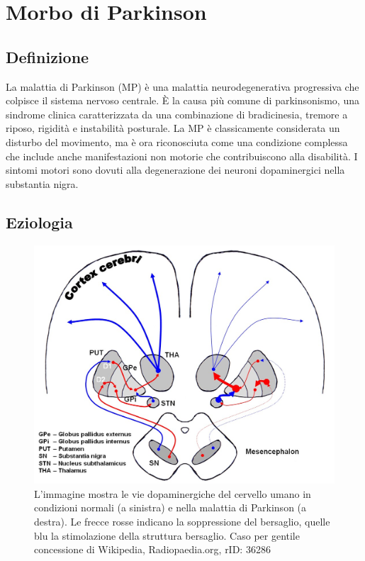 \section{Morbo di Parkinson}

\subsection{Definizione}

La malattia di Parkinson (MP) è una malattia neurodegenerativa progressiva che colpisce il sistema nervoso centrale. È la causa più comune di parkinsonismo, una sindrome clinica caratterizzata da una combinazione di bradicinesia, tremore a riposo, rigidità e instabilità posturale.
La MP è classicamente considerata un disturbo del movimento, ma è ora riconosciuta come una condizione complessa che include anche manifestazioni non motorie che contribuiscono alla disabilità. I sintomi motori sono dovuti alla degenerazione dei neuroni dopaminergici nella substantia nigra.

\subsection{Eziologia}



\begin{figure}[h]
	\centering
	\includegraphics[width=0.5\linewidth]{FileAusiliari/Immagini/degenerative/dopamine-in-parkinsons-disease-illustration}
	\caption[Vie dopaminergiche]{L'immagine mostra le vie dopaminergiche del cervello umano in condizioni normali (a sinistra) e nella malattia di Parkinson (a destra). Le frecce rosse indicano la soppressione del bersaglio, quelle blu la stimolazione della struttura bersaglio. Caso per gentile concessione di Wikipedia, Radiopaedia.org, rID: 36286}
	\label{fig:dopamine-in-parkinsons-disease-illustration}
\end{figure}

